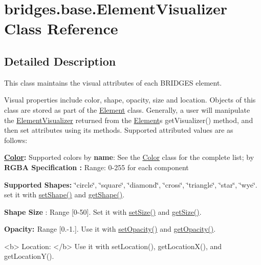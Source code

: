 \hypertarget{classbridges_1_1base_1_1_element_visualizer}{}\section{bridges.\+base.\+Element\+Visualizer Class Reference}
\label{classbridges_1_1base_1_1_element_visualizer}


\subsection{Detailed Description}
This class maintains the visual attributes of each B\+R\+I\+D\+G\+ES element. 

Visual properties include color, shape, opacity, size and location. Objects of this class are stored as part of the \mbox{\hyperlink{classbridges_1_1base_1_1_element}{Element}} class. Generally, a user will manipulate the \mbox{\hyperlink{classbridges_1_1base_1_1_element_visualizer}{Element\+Visualizer}} returned from the \mbox{\hyperlink{classbridges_1_1base_1_1_element}{Element}}\textquotesingle{}s get\+Visualizer() method, and then set attributes using its methods. Supported attributed values are as follows\+:~\newline


{\bfseries{\mbox{\hyperlink{classbridges_1_1base_1_1_color}{Color}}\+:}} Supported colors by {\bfseries{name}}\+: See the \mbox{\hyperlink{classbridges_1_1base_1_1_color}{Color}} class for the complete list; by {\bfseries{R\+G\+BA Specification \+:}} Range\+: 0-\/255 for each component

{\bfseries{ Supported Shapes\+: }} \char`\"{}circle\char`\"{}, \char`\"{}square\char`\"{}, \char`\"{}diamond\char`\"{}, \char`\"{}cross\char`\"{}, \char`\"{}triangle\char`\"{}, \char`\"{}star\char`\"{}, \char`\"{}wye\char`\"{}. set it with \mbox{\hyperlink{classbridges_1_1base_1_1_element_visualizer_ac3bad991904c8ad23e5233b341381d93}{set\+Shape()}} and \mbox{\hyperlink{classbridges_1_1base_1_1_element_visualizer_a8ef0825745e49f32b57e4bf6c891b57e}{get\+Shape()}}.

{\bfseries{ Shape Size}} \+: Range \mbox{[}0-\/50\mbox{]}. Set it with \mbox{\hyperlink{classbridges_1_1base_1_1_element_visualizer_aba410184f7df495594fc1fa7948335a5}{set\+Size()}} and \mbox{\hyperlink{classbridges_1_1base_1_1_element_visualizer_a0b7673bf724e3df1f94df50ad95ca5b1}{get\+Size()}}.

{\bfseries{ Opacity\+: }} Range \mbox{[}0.-\/1.\mbox{]}. Use it with \mbox{\hyperlink{classbridges_1_1base_1_1_element_visualizer_a932f62eb1bd0c92da265a7f903dd0790}{set\+Opacity()}} and \mbox{\hyperlink{classbridges_1_1base_1_1_element_visualizer_ab86ff39f17f8d1766670b18be88b5492}{get\+Opacity()}}. \begin{DoxyVerb}<b> Location: </b> Use it with setLocation(), getLocationX(), and getLocationY().
\end{DoxyVerb}


